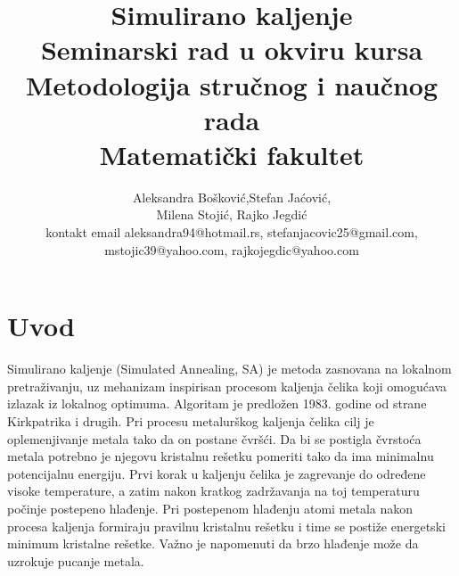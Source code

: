 \documentclass[a4paper]{article}
\begin{document}
\title{Simulirano kaljenje\\ \small{Seminarski rad u okviru kursa\\Metodologija stručnog i naučnog rada\\ Matematički fakultet}}

\author{Aleksandra Bošković,Stefan Jaćović,\\Milena Stojić, Rajko Jegdić\\ kontakt email aleksandra94@hotmail.rs, stefanjacovic25@gmail.com,\\mstojic39@yahoo.com, rajkojegdic@yahoo.com}


\maketitle


\tableofcontents

\newpage

\section{Uvod}
\label{sec:uvod}

Simulirano kaljenje (Simulated Annealing, SA) je metoda zasnovana na lokalnom pretraživanju, uz mehanizam inspirisan procesom kaljenja čelika koji omogućava izlazak iz lokalnog optimuma. Algoritam je predložen 1983. godine od strane Kirkpatrika i drugih.
Pri procesu metalurškog kaljenja čelika cilj je oplemenjivanje metala tako da on postane čvršći. Da bi se postigla čvrstoća metala potrebno je njegovu kristalnu rešetku pomeriti tako da ima minimalnu potencijalnu energiju. Prvi korak u kaljenju čelika je zagrevanje do
određene visoke temperature, a zatim nakon kratkog zadržavanja na toj temperaturu počinje postepeno hlađenje. Pri postepenom hlađenju atomi metala nakon procesa kaljenja formiraju
pravilnu kristalnu rešetku i time se postiže energetski minimum kristalne rešetke. Važno je napomenuti da brzo hlađenje može da uzrokuje pucanje metala.
\end{document}
